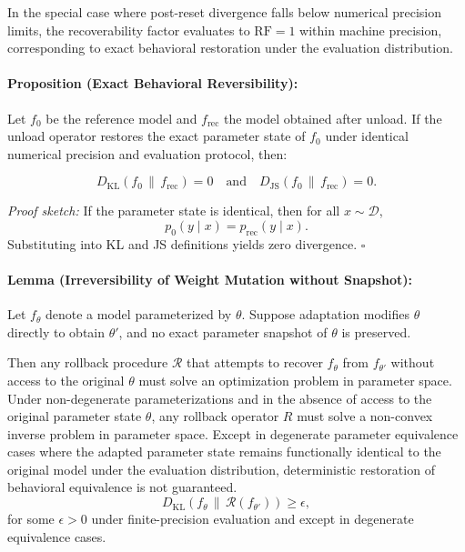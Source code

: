 \documentclass{article}
\begin{document}
	In the special case where post-reset divergence falls below numerical precision limits, the recoverability factor evaluates to $\mathrm{RF} = 1$ within machine precision, corresponding to exact behavioral restoration under the evaluation distribution.
	
	\paragraph{Proposition (Exact Behavioral Reversibility):}
	
	Let $f_0$ be the reference model and $f_{\mathrm{rec}}$ the model obtained after unload.  
	If the unload operator restores the exact parameter state of $f_0$ under identical numerical precision and evaluation protocol, then:
	
	\[
	D_{\mathrm{KL}}(f_0 \,\|\, f_{\mathrm{rec}}) = 0
	\quad \text{and} \quad
	D_{\mathrm{JS}}(f_0 \,\|\, f_{\mathrm{rec}}) = 0.
	\]
	
	\textit{Proof sketch:}
	If the parameter state is identical, then for all $x \sim \mathcal{D}$,
	\[
	p_0(y \mid x) = p_{\mathrm{rec}}(y \mid x).
	\]
	Substituting into KL and JS definitions yields zero divergence.
	\hfill $\square$
	
	\paragraph{Lemma (Irreversibility of Weight Mutation without Snapshot):}
	
	Let $f_\theta$ denote a model parameterized by $\theta$.
	Suppose adaptation modifies $\theta$ directly to obtain $\theta'$, 
	and no exact parameter snapshot of $\theta$ is preserved.
	
	Then any rollback procedure $\mathcal{R}$ that attempts to recover $f_\theta$
	from $f_{\theta'}$ without access to the original $\theta$
	must solve an optimization problem in parameter space. Under non-degenerate parameterizations and in the absence of access to the original parameter state $\theta$, any rollback operator $R$ must solve a non-convex inverse problem in parameter space. Except in degenerate parameter equivalence cases where the adapted parameter state remains functionally identical to the original model under the evaluation distribution, deterministic restoration of behavioral equivalence is not guaranteed.
	\[
	D_{\mathrm{KL}}\!\left(f_\theta \,\middle\|\, \mathcal{R}(f_{\theta'})\right)
	\ge \epsilon,
	\]
	for some $\epsilon > 0$ under finite-precision evaluation and except in degenerate equivalence cases.
	
\end{document}
